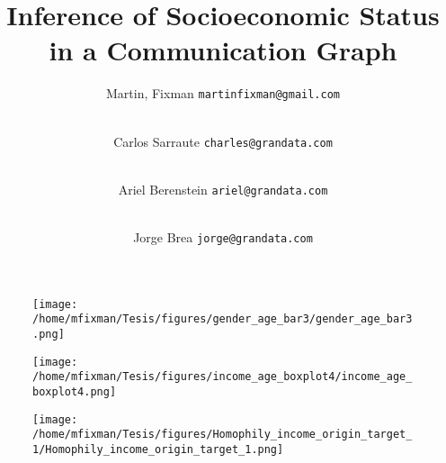 



\title{Inference of Socioeconomic Status in a Communication Graph}
\author{
	Martin, Fixman
	\texttt{martinfixman@gmail.com}
	\and \\
	Carlos Sarraute
	\texttt{charles@grandata.com}
	\and \\
	Ariel Berenstein
	\texttt{ariel@grandata.com}
	\and \\
	Jorge Brea
	\texttt{jorge@grandata.com}
}
\maketitle

\begin{abstract}\end{abstract}





\begin{figure}[]
\begin{center}
\texttt{[image: /home/mfixman/Tesis/figures/gender\_age\_bar3/gender\_age\_bar3.png]}
\caption{ \protect}
\end{center}
\end{figure}


\begin{figure}[]
\begin{center}
\texttt{[image: /home/mfixman/Tesis/figures/income\_age\_boxplot4/income\_age\_boxplot4.png]}
\caption{ \protect}
\end{center}
\end{figure}





\begin{figure}[]
\begin{center}
\texttt{[image: /home/mfixman/Tesis/figures/Homophily\_income\_origin\_target\_1/Homophily\_income\_origin\_target\_1.png]}
\caption{ \protect}
\end{center}
\end{figure}








{}


